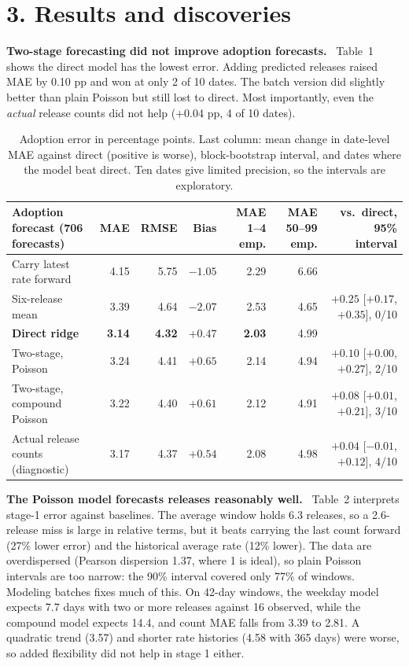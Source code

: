 \documentclass[10pt]{article}
\newcommand{\sub}[1]{\textbf{#1}\ }
\begin{document}
\section{3. Results and discoveries}
\sub{Two-stage forecasting did not improve adoption forecasts.} Table~1 shows the direct model has the lowest error. Adding predicted releases raised MAE by 0.10 pp and won at only 2 of 10 dates. The batch version did slightly better than plain Poisson but still lost to direct. Most importantly, even the \emph{actual} release counts did not help (+0.04 pp, 4 of 10 dates).

\begin{table}[h]\centering\footnotesize\setlength{\tabcolsep}{4pt}
\begin{tabular}{@{}lrrrrrr@{}}\toprule
Adoption forecast (706 forecasts) & MAE & RMSE & Bias & MAE 1--4 emp. & MAE 50--99 emp. & vs.\ direct, 95\% interval\\\midrule
Carry latest rate forward & 4.15 & 5.75 & $-1.05$ & 2.29 & 6.66 & \\
Six-release mean & 3.39 & 4.64 & $-2.07$ & 2.53 & 4.65 & $+0.25$ [$+0.17$, $+0.35$], 0/10\\
\textbf{Direct ridge} & \textbf{3.14} & \textbf{4.32} & $+0.47$ & \textbf{2.03} & 4.99 & \\
Two-stage, Poisson & 3.24 & 4.41 & $+0.65$ & 2.14 & 4.94 & $+0.10$ [$+0.00$, $+0.27$], 2/10\\
Two-stage, compound Poisson & 3.22 & 4.40 & $+0.61$ & 2.12 & 4.91 & $+0.08$ [$+0.01$, $+0.21$], 3/10\\
Actual release counts (diagnostic) & 3.17 & 4.37 & $+0.54$ & 2.08 & 4.98 & $+0.04$ [$-0.01$, $+0.12$], 4/10\\\bottomrule
\end{tabular}
\caption{Adoption error in percentage points. Last column: mean change in date-level MAE against direct (positive is worse), block-bootstrap interval, and dates where the model beat direct. Ten dates give limited precision, so the intervals are exploratory.}
\end{table}

\sub{The Poisson model forecasts releases reasonably well.} Table~2 interprets stage-1 error against baselines. The average window holds 6.3 releases, so a 2.6-release miss is large in relative terms, but it beats carrying the last count forward (27\% lower error) and the historical average rate (12\% lower). The data are overdispersed (Pearson dispersion 1.37, where 1 is ideal), so plain Poisson intervals are too narrow: the 90\% interval covered only 77\% of windows. Modeling batches fixes much of this. On 42-day windows, the weekday model expects 7.7 days with two or more releases against 16 observed, while the compound model expects 14.4, and count MAE falls from 3.39 to 2.81. A quadratic trend (3.57) and shorter rate histories (4.58 with 365 days) were worse, so added flexibility did not help in stage 1 either.
\end{document}
